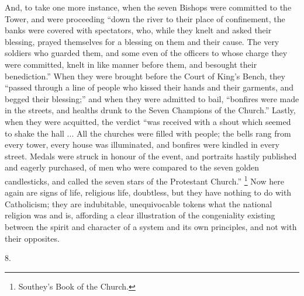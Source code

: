 And, to take one more instance, when the seven Bishops were
committed to the Tower, and were proceeding ``down the river to
their place of confinement, the banks were covered with spectators,
who, while they knelt and asked their blessing, prayed themselves for
a blessing on them and their cause. The very soldiers who guarded
them, and some even of the officers to whose charge they were
committed, knelt in like manner before them, and besought their
benediction.'' When they were brought before the Court of King's
Bench, they ``passed through a line of people who kissed their
hands and their garments, and begged their blessing;'' and when
they were admitted to bail, ``bonfires were made in the streets,
and healths drunk to the Seven Champions of the Church.'' Lastly,
when they were acquitted, the verdict ``was received with a shout
which seemed to shake the hall ... All the churches were filled with
people; the bells rang from every tower, every house was illuminated,
and bonfires were kindled in every street. Medals were struck in
honour of the event, and portraits hastily published and eagerly
purchased, of men who were compared to the seven golden candlesticks,
and called the seven stars of the Protestant Church.'' \footnote{Southey's Book of the Church.} Now here again are signs of life, religious life, doubtless,
but they have nothing to do with Catholicism; they are indubitable,
unequivocable tokens what the national religion was and is, affording
a clear illustration of the congeniality existing between the spirit
and character of a system and its own principles, and not with their
opposites.

8.

